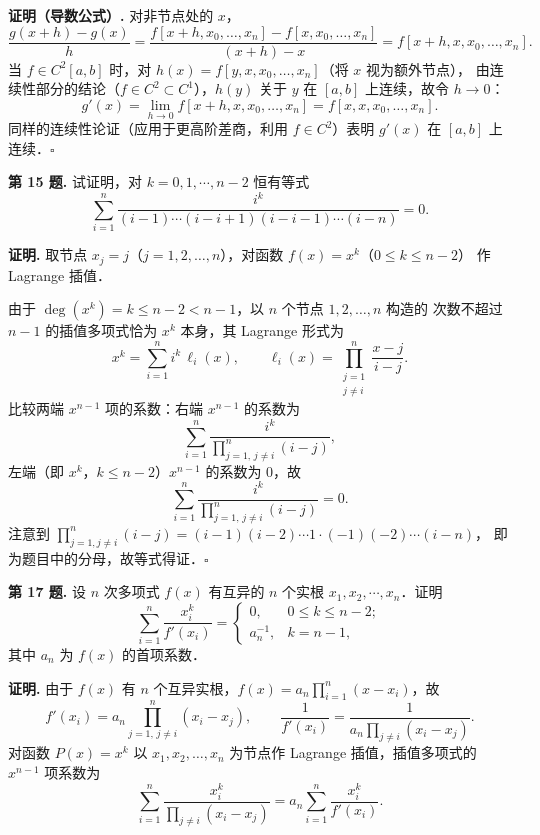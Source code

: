 \documentclass[UTF8,a4paper,11pt]{ctexart}
\newcommand*{\QED}{\hfill\ensuremath{\square}}
\begin{document}
\medskip
\noindent\textbf{证明（导数公式）.}\quad
对非节点处的 $x$，
\[
  \frac{g(x+h) - g(x)}{h}
  = \frac{f[x+h, x_0, \ldots, x_n] - f[x, x_0, \ldots, x_n]}{(x+h) - x}
  = f[x+h, x, x_0, \ldots, x_n].
\]
当 $f \in C^2[a,b]$ 时，对 $h(x) = f[y, x, x_0, \ldots, x_n]$（将 $x$ 视为额外节点），
由连续性部分的结论（$f \in C^2 \subset C^1$），$h(y)$ 关于 $y$ 在 $[a,b]$ 上连续，故令 $h \to 0$：
\[
  g'(x) = \lim_{h \to 0} f[x+h, x, x_0, \ldots, x_n] = f[x, x, x_0, \ldots, x_n].
\]
同样的连续性论证（应用于更高阶差商，利用 $f \in C^2$）表明 $g'(x)$ 在 $[a,b]$ 上连续．\QED

\bigskip\bigskip

\noindent\textbf{第 15 题.}\quad
试证明，对 $k = 0, 1, \cdots, n-2$ 恒有等式
\[
  \sum_{i=1}^{n}
  \frac{i^k}{(i-1)\cdots(i-i+1)(i-i-1)\cdots(i-n)} = 0.
\]

\medskip
\noindent\textbf{证明.}\quad
取节点 $x_j = j$（$j = 1, 2, \ldots, n$），对函数 $f(x) = x^k$（$0 \leqslant k \leqslant n-2$）
作 Lagrange 插值．

由于 $\deg(x^k) = k \leqslant n-2 < n-1$，以 $n$ 个节点 $1, 2, \ldots, n$ 构造的
次数不超过 $n-1$ 的插值多项式恰为 $x^k$ 本身，其 Lagrange 形式为
\[
  x^k = \sum_{i=1}^{n} i^k \, \ell_i(x),
  \qquad \ell_i(x) = \prod_{\substack{j=1\\j \neq i}}^{n} \frac{x - j}{i - j}.
\]
比较两端 $x^{n-1}$ 项的系数：右端 $x^{n-1}$ 的系数为
\[
  \sum_{i=1}^{n} \frac{i^k}{\displaystyle\prod_{j=1,\, j \neq i}^{n}(i-j)},
\]
左端（即 $x^k$，$k \leqslant n-2$）$x^{n-1}$ 的系数为 $0$，故
\[
  \sum_{i=1}^{n}
  \frac{i^k}{\displaystyle\prod_{j=1,\, j \neq i}^{n}(i-j)} = 0.
\]
注意到 $\displaystyle\prod_{j=1, j\neq i}^{n}(i-j) = (i-1)(i-2)\cdots 1 \cdot (-1)(-2)\cdots(i-n)$，
即为题目中的分母，故等式得证．\QED

\bigskip\bigskip

\noindent\textbf{第 17 题.}\quad
设 $n$ 次多项式 $f(x)$ 有互异的 $n$ 个实根 $x_1, x_2, \cdots, x_n$．证明
\[
  \sum_{i=1}^{n} \frac{x_i^k}{f'(x_i)}
  = \begin{cases}
      0,       & 0 \leqslant k \leqslant n-2;\\
      a_n^{-1}, & k = n-1,
    \end{cases}
\]
其中 $a_n$ 为 $f(x)$ 的首项系数．

\medskip
\noindent\textbf{证明.}\quad
由于 $f(x)$ 有 $n$ 个互异实根，$f(x) = a_n \displaystyle\prod_{i=1}^{n}(x - x_i)$，故
\[
  f'(x_i) = a_n \prod_{j=1,\, j \neq i}^{n}(x_i - x_j),
  \qquad \frac{1}{f'(x_i)} = \frac{1}{a_n \displaystyle\prod_{j \neq i}(x_i - x_j)}.
\]
对函数 $P(x) = x^k$ 以 $x_1, x_2, \ldots, x_n$ 为节点作 Lagrange 插值，插值多项式的
$x^{n-1}$ 项系数为
\[
  \sum_{i=1}^{n} \frac{x_i^k}{\displaystyle\prod_{j \neq i}(x_i - x_j)}
  = a_n \sum_{i=1}^{n} \frac{x_i^k}{f'(x_i)}.
\]
\end{document}
